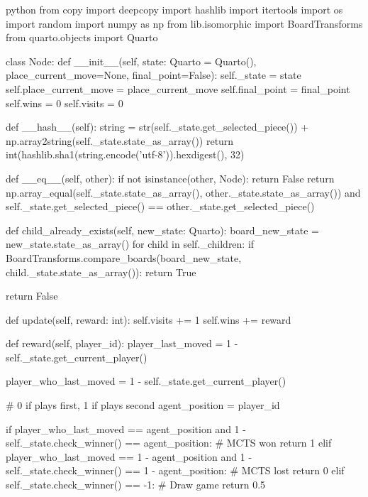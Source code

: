 \begin{mintedbox}{python}
from copy import deepcopy
import hashlib
import itertools
import os
import random
import numpy as np
from lib.isomorphic import BoardTransforms
from quarto.objects import Quarto

class Node:
    def __init__(self, state: Quarto = Quarto(), place_current_move=None, final_point=False):
        self._state = state
        self.place_current_move = place_current_move
        self.final_point = final_point
        self.wins = 0
        self.visits = 0

    def __hash__(self):
        string = str(self._state.get_selected_piece()) + np.array2string(self._state.state_as_array())
        return int(hashlib.sha1(string.encode('utf-8')).hexdigest(), 32)

    def __eq__(self, other):
        if not isinstance(other, Node):
            return False
        return np.array_equal(self._state.state_as_array(), other._state.state_as_array()) and self._state.get_selected_piece() == other._state.get_selected_piece()

    def child_already_exists(self, new_state: Quarto):
        board_new_state = new_state.state_as_array()
        for child in self._children:
            if BoardTransforms.compare_boards(board_new_state, child._state.state_as_array()):
                return True

        return False

    def update(self, reward: int):
        self.visits += 1
        self.wins += reward

    def reward(self, player_id):
        player_last_moved = 1 - self._state.get_current_player()

        player_who_last_moved = 1 - self._state.get_current_player()

        # 0 if plays first, 1 if plays second
        agent_position = player_id

        if player_who_last_moved == agent_position and 1 - self._state.check_winner() == agent_position:
            # MCTS won
            return 1
        elif player_who_last_moved == 1 - agent_position and 1 - self._state.check_winner() == 1 - agent_position:
            # MCTS lost
            return 0
        elif self._state.check_winner() == -1:
            # Draw game
            return 0.5


\end{mintedbox}
